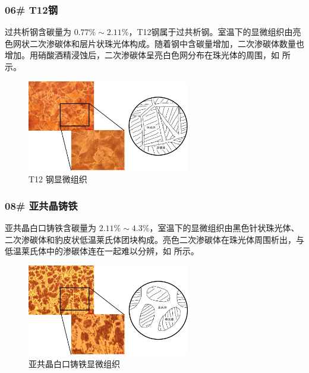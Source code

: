 \documentclass[a4paper,utf8]{article}
\begin{document}
        \subsubsection{06# T12钢}
            过共析钢含碳量为 $0.77\%\sim 2.11\%$，T12钢属于过共析钢。室温下的显微组织由亮色网状二次渗碳体和层片状珠光体构成。随着钢中含碳量增加，二次渗碳体数量也增加。用硝酸酒精浸蚀后，二次渗碳体呈亮白色网分布在珠光体的周围，如 所示。
            \begin{figure}[!ht]
                \includegraphics[height=40mm]{result/4.pdf}
                \caption{T12 钢显微组织\label{fig:4}}
            \end{figure}

        \subsubsection{08# 亚共晶铸铁}
            亚共晶白口铸铁含碳量为 $2.11\%\sim 4.3\%$，室温下的显微组织由黑色针状珠光体、二次渗碳体和豹皮状低温莱氏体团块构成。亮色二次渗碳体在珠光体周围析出，与低温莱氏体中的渗碳体连在一起难以分辨，如 所示。
            \begin{figure}[!ht]
                \includegraphics[height=40mm]{result/5.pdf}
                \caption{亚共晶白口铸铁显微组织\label{fig:5}}
            \end{figure}
\end{document}

